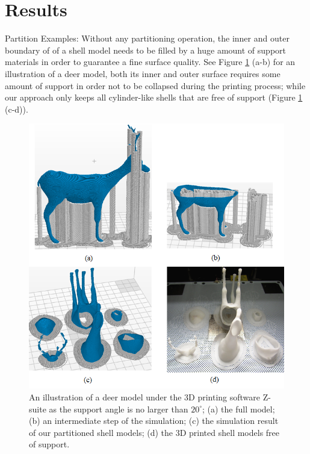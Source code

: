 \section{Results}

Partition Examples: Without any partitioning operation, the inner and outer boundary of of a shell model needs to be filled by a huge amount of support materials in order to guarantee a fine surface quality. See Figure \ref{fig:dear-simulation} (a-b) for an illustration of a deer model, both its inner and outer surface requires some amount of support in order not to be collapsed during the printing process; while our approach only keeps all cylinder-like shells that are free of support (Figure \ref{fig:dear-simulation} (c-d)).

\begin{figure}[tbp]
  \centering
  \includegraphics[width=\linewidth]{figs/dear-simulation.png}
  \caption{\label{fig:dear-simulation}%
           An illustration of a deer model under the 3D printing software Z-suite as the support angle is no larger than $20^{\circ}$; (a) the full model; (b) an intermediate step of the simulation; (c) the simulation result of our partitioned shell models; (d) the 3D printed shell models free of support.}
\end{figure}

